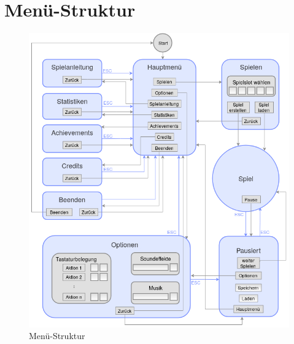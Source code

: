 \section{Menü-Struktur}


%
%


\begin{figure}[ht]
	\centering
	\includegraphics[width=1\textwidth]{menu_structure.png}
	\caption{Menü-Struktur}
	\label{menu}
\end{figure}


